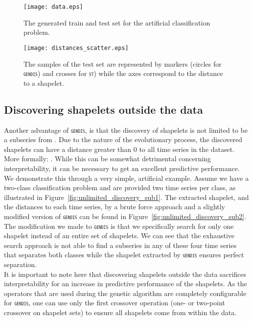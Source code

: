 \documentclass[runningheads]{llncs}
\begin{document}
\begin{figure*}[h!]
	\centering
	\texttt{[image: data.eps]}
	\caption{The generated train and test set for the artificial classification problem.}
	\label{fig:artificial_data}      
\end{figure*}

\begin{figure*}[h!]
	\centering
	\texttt{[image: distances\_scatter.eps]}
	\caption{The samples of the test set are represented by markers (circles for \textsc{\texttt{gendis}}) and crosses for \textsc{\texttt{st}}) while the axes correspond to the distance to a shapelet.}
	\label{fig:distances_scatter}      
\end{figure*}

\subsection{Discovering shapelets outside the data} \label{subsec:outside}
Another advantage of \textsc{\texttt{gendis}}, is that the discovery of shapelets is not limited to be a subseries from . Due to the nature of the evolutionary process, the discovered shapelets can have a distance greater than 0 to all time series in the dataset. More formally: . While this can be somewhat detrimental concerning interpretability, it can be necessary to get an excellent predictive performance. We demonstrate this through a very simple, artificial example. Assume we have a two-class classification problem and are provided two time series per class, as illustrated in Figure~\ref{fig:unlimited_discovery_sub1}. The extracted shapelet, and the distances to each time series, by a brute force approach and a slightly modified version of \textsc{\texttt{gendis}} can be found in Figure~\ref{fig:unlimited_discovery_sub2}. The modification we made to \textsc{\texttt{gendis}} is that we specifically search for only one shapelet instead of an entire set of shapelets. We can see that the exhaustive search approach is not able to find a subseries in any of these four time series that separates both classes while the shapelet extracted by \textsc{\texttt{gendis}} ensures perfect separation. \\

It is important to note here that discovering shapelets outside the data sacrifices interpretability for an increase in predictive performance of the shapelets. As the operators that are used during the genetic algorithm are completely configurable for \textsc{\texttt{gendis}}, one can use only the first crossover operation (one- or two-point crossover on shapelet sets) to ensure all shapelets come from within the data.
\end{document}

